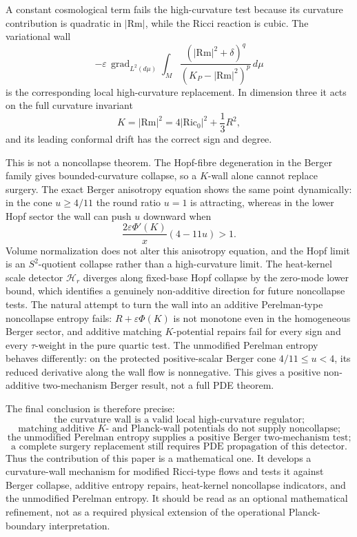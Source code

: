 \documentclass[11pt]{amsart}
\newcommand{\Rm}{\mathrm{Rm}}
\newcommand{\Ric}{\mathrm{Ric}}
\newcommand{\grad}{\operatorname{grad}}
\newcommand{\KP}{K_{\!P}}
\begin{document}
A constant cosmological term fails the high-curvature test because its
curvature contribution is quadratic in \(|\Rm|\), while the Ricci reaction is
cubic.  The variational wall
\[
        -\varepsilon\,\grad_{L^2(d\mu)}
        \int_M
        \frac{(|\Rm|^2+\delta)^q}{(\KP-|\Rm|^2)^p}\,d\mu
\]
is the corresponding local high-curvature replacement.  In dimension three it
acts on the full curvature invariant
\[
        K=|\Rm|^2=4|\Ric_0|^2+\frac13R^2,
\]
and its leading conformal drift has the correct sign and degree.

This is not a noncollapse theorem.  The Hopf-fibre degeneration in the Berger
family gives bounded-curvature collapse, so a \(K\)-wall alone cannot replace
surgery.  The exact Berger anisotropy equation shows the same point
dynamically: in the cone \(u\ge4/11\) the round ratio \(u=1\) is attracting,
whereas in the lower Hopf sector the wall can push \(u\) downward when
\[
        \frac{2\varepsilon\Phi'(K)}{x}(4-11u)>1 .
\]
Volume normalization does not alter this anisotropy equation, and the Hopf
limit is an \(S^2\)-quotient collapse rather than a high-curvature limit.
The heat-kernel scale detector \(\mathcal H_r\) diverges along fixed-base Hopf
collapse by the zero-mode lower bound, which identifies a genuinely
non-additive direction for future noncollapse tests.
The natural attempt to turn the wall into an additive Perelman-type
noncollapse entropy fails: \(R+\varepsilon\Phi(K)\) is not monotone even in the
homogeneous Berger sector, and additive matching \(K\)-potential repairs fail
for every sign and every \(\tau\)-weight in the pure quartic test.  The
unmodified Perelman entropy behaves differently: on the protected
positive-scalar Berger cone \(4/11\le u<4\), its reduced derivative along the
wall flow is nonnegative.  This gives a positive non-additive two-mechanism
Berger result, not a full PDE theorem.

The final conclusion is therefore precise:
\[
        \boxed{\text{the curvature wall is a valid local high-curvature regulator;}}
\]
\[
        \boxed{\text{matching additive \(K\)- and Planck-wall potentials do not supply noncollapse;}}
\]
\[
        \boxed{\text{the unmodified Perelman entropy supplies a positive Berger two-mechanism test;}}
\]
\[
        \boxed{\text{a complete surgery replacement still requires PDE propagation of this detector.}}
\]
Thus the contribution of this paper is a mathematical one.  It develops a
curvature-wall mechanism for modified Ricci-type flows and tests it against
Berger collapse, additive entropy repairs, heat-kernel noncollapse indicators,
and the unmodified Perelman entropy.  It should be read as an optional
mathematical refinement, not as a required physical extension of the
operational Planck-boundary interpretation.
\end{document}
